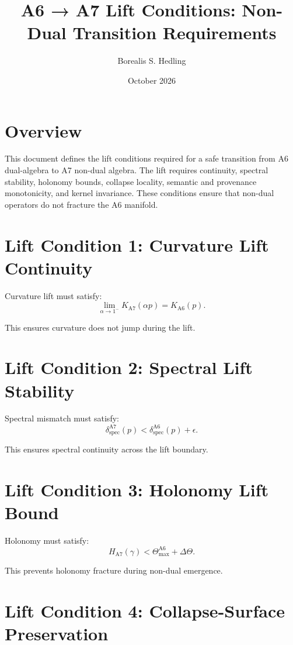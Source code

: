 \documentclass[11pt]{article}
\title{A6 → A7 Lift Conditions: Non-Dual Transition Requirements}
\author{Borealis S. Hedling}
\date{October 2026}
\begin{document}
\maketitle

\section*{Overview}

This document defines the lift conditions required for a safe transition
from A6 dual-algebra to A7 non-dual algebra. The lift requires continuity,
spectral stability, holonomy bounds, collapse locality, semantic and
provenance monotonicity, and kernel invariance. These conditions ensure
that non-dual operators do not fracture the A6 manifold.

\section{Lift Condition 1: Curvature Lift Continuity}

Curvature lift must satisfy:
\[
\lim_{\alpha \to 1^-} K_{\mathrm{A7}}(\alpha p)
  = K_{\mathrm{A6}}(p).
\]

This ensures curvature does not jump during the lift.

\section{Lift Condition 2: Spectral Lift Stability}

Spectral mismatch must satisfy:
\[
\delta_{\mathrm{spec}}^{\mathrm{A7}}(p)
  < \delta_{\mathrm{spec}}^{\mathrm{A6}}(p)
  + \epsilon.
\]

This ensures spectral continuity across the lift boundary.

\section{Lift Condition 3: Holonomy Lift Bound}

Holonomy must satisfy:
\[
H_{\mathrm{A7}}(\gamma)
  < \Theta_{\max}^{\mathrm{A6}} + \Delta\Theta.
\]

This prevents holonomy fracture during non-dual emergence.

\section{Lift Condition 4: Collapse-Surface Preservation}
\end{document}
